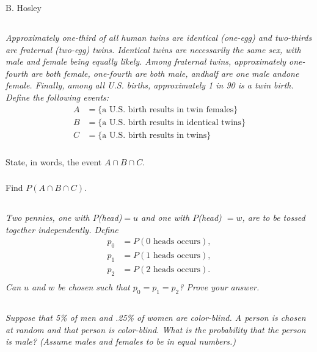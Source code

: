 \documentclass[12pt]{amsart}
\begin{document}
\raggedbottom

\hspace{\fill} {\large B. Hosley}
\bigskip


\setcounter{section}{1}
\setcounter{subsection}{4}
\subsection{} %
\textit{Approximately one-third of all human twins are identical (one-egg) and two-thirds are fraternal (two-egg) twins. 
	Identical twins are necessarily the same sex, with male and female being equally likely. 
	Among fraternal twins, approximately one-fourth are both female, one-fourth are both male, andhalf are one male andone female. 
	Finally, among all U.S. births, approximately 1 in 90 is a twin birth. Define the following events:}
	\begin{align*}
		A &= \{\text{a U.S. birth results in twin females}\} \\
		B &= \{\text{a U.S. birth results in identical twins}\} \\
		C &= \{\text{a U.S. birth results in twins}\}
	\end{align*}
	\subsubsection{} State, in words, the event \(A\cap B\cap C\).
	\subsubsection{} Find \(P(A\cap B\cap C)\).


\subsection{} %
\textit{Two pennies, one with \(P\)(head)\( = u\) and one with \(P\)(head) \(= w\), are to be tossed together independently. Define}
\begin{align*}
	p_0 &= P(\text{0 heads occurs}), \\
	p_1 &= P(\text{1 heads occurs}), \\
	p_2 &= P(\text{2 heads occurs}). \\
\end{align*}
\textit{Can \(u\) and \(w\) be chosen such that \(p_0 = p_1 = p_2\)? Prove your answer.}

\setcounter{subsection}{32}
\subsection{} %
\textit{Suppose that 5\% of men and .25\% of women are color-blind. A person is chosen at random and that person is color-blind. 
	What is the probability that the person is male? (Assume males and females to be in equal numbers.)}
\end{document}
